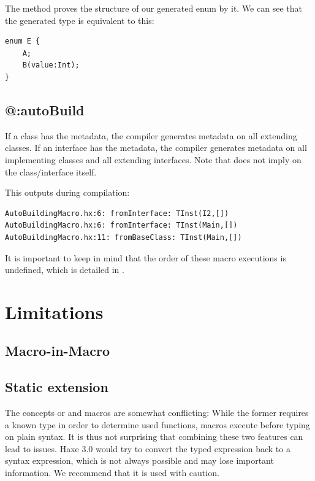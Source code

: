 \documentclass{haxe}
\begin{document}
The  method proves the structure of our generated enum by  it. We can see that the generated type is equivalent to this:

\begin{lstlisting}
enum E {
	A;
	B(value:Int);
}
\end{lstlisting}


\subsection{@:autoBuild}
\label{macro-auto-build}

If a class has the  metadata, the compiler generates  metadata on all extending classes. If an interface has the  metadata, the compiler generates  metadata on all implementing classes and all extending interfaces. Note that  does not imply  on the class/interface itself.


This outputs during compilation:

\begin{lstlisting}
AutoBuildingMacro.hx:6: fromInterface: TInst(I2,[])
AutoBuildingMacro.hx:6: fromInterface: TInst(Main,[])
AutoBuildingMacro.hx:11: fromBaseClass: TInst(Main,[])
\end{lstlisting}

It is important to keep in mind that the order of these macro executions is undefined, which is detailed in .



\section{Limitations}
\label{macro-limitations}

\subsection{Macro-in-Macro}
\label{macro-limitations-macro-in-macro}

\subsection{Static extension}
\label{macro-limitations-static-extension}

The concepts or  and macros are somewhat conflicting: While the former requires a known type in order to determine used functions, macros execute before typing on plain syntax. It is thus not surprising that combining these two features can lead to issues. Haxe 3.0 would try to convert the typed expression back to a syntax expression, which is not always possible and may lose important information. We recommend that it is used with caution.
\end{document}

